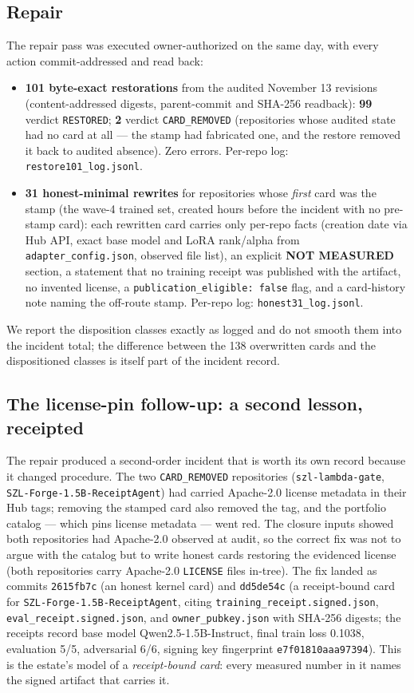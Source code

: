 \subsection{Repair}
The repair pass was executed owner-authorized on the same day, with every action commit-addressed and read back:
\begin{itemize}
\item \textbf{101 byte-exact restorations} from the audited November 13 revisions (content-addressed digests, parent-commit and SHA-256 readback): \textbf{99} verdict \texttt{RESTORED}; \textbf{2} verdict \texttt{CARD\_REMOVED} (repositories whose audited state had no card at all --- the stamp had fabricated one, and the restore removed it back to audited absence). Zero errors. Per-repo log: \texttt{restore101\_log.jsonl}.
\item \textbf{31 honest-minimal rewrites} for repositories whose \emph{first} card was the stamp (the wave-4 trained set, created hours before the incident with no pre-stamp card): each rewritten card carries only per-repo facts (creation date via Hub API, exact base model and LoRA rank/alpha from \texttt{adapter\_config.json}, observed file list), an explicit \textbf{NOT MEASURED} section, a statement that no training receipt was published with the artifact, no invented license, a \texttt{publication\_eligible: false} flag, and a card-history note naming the off-route stamp. Per-repo log: \texttt{honest31\_log.jsonl}.
\end{itemize}
We report the disposition classes exactly as logged and do not smooth them into the incident total; the difference between the 138 overwritten cards and the dispositioned classes is itself part of the incident record.

\subsection{The license-pin follow-up: a second lesson, receipted}
The repair produced a second-order incident that is worth its own record because it changed procedure. The two \texttt{CARD\_REMOVED} repositories (\texttt{szl-lambda-gate}, \texttt{SZL-Forge-1.5B-ReceiptAgent}) had carried Apache-2.0 license metadata in their Hub tags; removing the stamped card also removed the tag, and the portfolio catalog --- which pins license metadata --- went red. The closure inputs showed both repositories had Apache-2.0 observed at audit, so the correct fix was not to argue with the catalog but to write honest cards restoring the evidenced license (both repositories carry Apache-2.0 \texttt{LICENSE} files in-tree). The fix landed as commits \texttt{2615fb7c} (an honest kernel card) and \texttt{dd5de54c} (a receipt-bound card for \texttt{SZL-Forge-1.5B-ReceiptAgent}, citing \texttt{training\_receipt.signed.json}, \texttt{eval\_receipt.signed.json}, and \texttt{owner\_pubkey.json} with SHA-256 digests; the receipts record base model Qwen2.5-1.5B-Instruct, final train loss 0.1038, evaluation 5/5, adversarial 6/6, signing key fingerprint \texttt{e7f01810aaa97394}). This is the estate's model of a \emph{receipt-bound card}: every measured number in it names the signed artifact that carries it.

